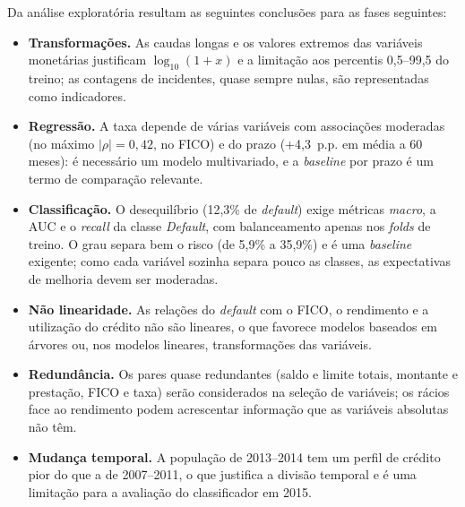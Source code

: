 Da análise exploratória resultam as seguintes conclusões para as fases seguintes:
\begin{itemize}
  \item \textbf{Transformações.} As caudas longas e os valores extremos das variáveis
  monetárias justificam $\log_{10}(1+x)$ e a limitação aos percentis 0,5--99,5 do treino;
  as contagens de incidentes, quase sempre nulas, são representadas como indicadores.
  \item \textbf{Regressão.} A taxa depende de várias variáveis com associações moderadas
  (no máximo $|\rho| = 0{,}42$, no FICO) e do prazo (+4,3~p.p. em média a 60 meses): é
  necessário um modelo multivariado, e a \textit{baseline} por prazo é um termo de
  comparação relevante.
  \item \textbf{Classificação.} O desequilíbrio (12,3\% de \textit{default}) exige
  métricas \textit{macro}, a AUC e o \textit{recall} da classe \textit{Default}, com
  balanceamento apenas nos \textit{folds} de treino. O grau separa bem o risco (de 5,9\% a
  35,9\%) e é uma \textit{baseline} exigente; como cada variável sozinha separa pouco as
  classes, as expectativas de melhoria devem ser moderadas.
  \item \textbf{Não linearidade.} As relações do \textit{default} com o FICO, o rendimento
  e a utilização do crédito não são lineares, o que favorece modelos baseados em árvores
  ou, nos modelos lineares, transformações das variáveis.
  \item \textbf{Redundância.} Os pares quase redundantes (saldo e limite totais, montante
  e prestação, FICO e taxa) serão considerados na seleção de variáveis; os rácios face ao
  rendimento podem acrescentar informação que as variáveis absolutas não têm.
  \item \textbf{Mudança temporal.} A população de 2013--2014 tem um perfil de crédito pior
  do que a de 2007--2011, o que justifica a divisão temporal e é uma limitação para a
  avaliação do classificador em 2015.
\end{itemize}

\FloatBarrier
